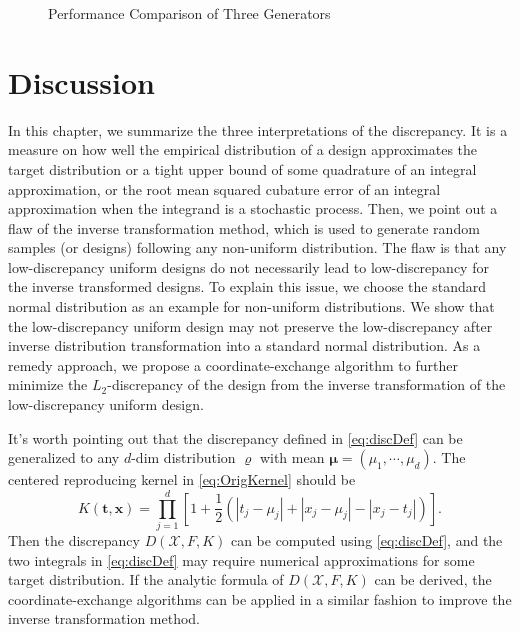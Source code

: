 \documentclass[graybox]{svmult}
\newcommand{\vx}{\boldsymbol{x}}
\newcommand{\vt}{\boldsymbol{t}}
\newcommand{\Xdes}{\mathcal{X}}
\newcommand{\Ftar}{F}
\begin{document}
\begin{figure}[ht]
\quad
{}
\caption{Performance Comparison of Three Generators}\label{fig:generatorcomp}
\end{figure}

\section{Discussion}
In this chapter, we summarize the three interpretations of the discrepancy. 
It is a measure on how well the empirical distribution of a design approximates the target distribution or a tight upper bound of some quadrature of an integral approximation, or the root mean squared cubature error of an integral approximation when the integrand is a stochastic process. 
Then, we point out a flaw of the inverse transformation method, which is used to generate random samples (or designs) following any non-uniform distribution. 
The flaw is that any low-discrepancy uniform designs do not necessarily lead to low-discrepancy for the inverse transformed designs. 
To explain this issue, we choose the standard normal distribution as an example for non-uniform distributions. 
We show that the low-discrepancy uniform design may not preserve the low-discrepancy after inverse distribution transformation into a standard normal distribution. 
As a remedy approach, we propose a coordinate-exchange algorithm to further minimize the $L_2$-discrepancy of the design from the inverse transformation of the low-discrepancy uniform design. 

It's worth pointing out that the discrepancy defined in \eqref{eq:discDef} can be generalized to any $d$-dim distribution $\varrho$ with mean $\boldsymbol{\mu} = (\mu_1,\cdots,\mu_d)$. The centered reproducing kernel in \eqref{eq:OrigKernel} should be 
\begin{equation} \label{ExtKernel}
     K(\vt,\vx)  = \prod\limits_{j=1}^d\left[1+ \frac 12 \left(|t_j-\mu_j|+ |x_j-\mu_j|- |x_j-t_j| \right)\right].
\end{equation}
Then the discrepancy $D(\Xdes,\Ftar,K)$ can be computed using \eqref{eq:discDef}, and the two integrals in \eqref{eq:discDef} may require numerical approximations for some target distribution. 
If the analytic formula of $D(\Xdes,\Ftar,K)$ can be derived, the coordinate-exchange algorithms can be applied in a similar fashion to improve the inverse transformation method. 
\end{document}
